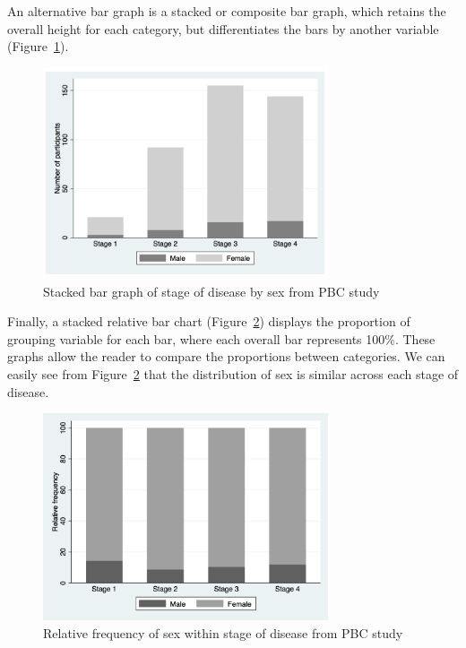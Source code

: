 \documentclass[
  a4paper,
]{memoir}
\begin{document}
An alternative bar graph is a stacked or composite bar graph, which
retains the overall height for each category, but differentiates the
bars by another variable (Figure~\ref{fig-bar-3}).

\begin{figure}[H]

{\centering \includegraphics[width=0.75\textwidth,height=\textheight]{img/mod01/pbc-bar-stage-sex-stacked.png}

}

\caption{\label{fig-bar-3}Stacked bar graph of stage of disease by sex
from PBC study}

\end{figure}

Finally, a stacked relative bar chart (Figure~\ref{fig-bar-4}) displays
the proportion of grouping variable for each bar, where each overall bar
represents 100\%. These graphs allow the reader to compare the
proportions between categories. We can easily see from
Figure~\ref{fig-bar-4} that the distribution of sex is similar across
each stage of disease.

\begin{figure}[H]

{\centering \includegraphics[width=0.75\textwidth,height=\textheight]{img/mod01/pbc-bar-stage-sex-stacked-relative.jpg}

}

\caption{\label{fig-bar-4}Relative frequency of sex within stage of
disease from PBC study}

\end{figure}
\end{document}
